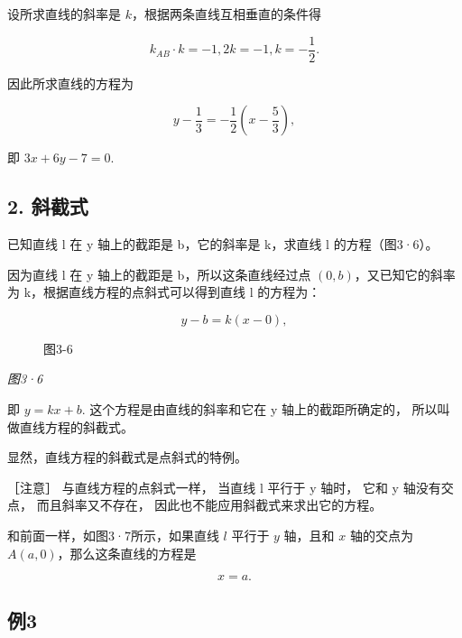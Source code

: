 设所求直线的斜率是 \(k\)，根据两条直线互相垂直的条件得

\[
k_{AB} \cdot k = - 1, 2 k = - 1, k = - \frac {1}{2}.
\]

因此所求直线的方程为

\[
y - \frac {1}{3} = - \frac {1}{2} (x - \frac {5}{3}),
\]

即 \(3x + 6y - 7 = 0.\)

\subsection{2. 斜截式}\label{ux659cux622aux5f0f}

已知直线 l 在 y 轴上的截距是 b，它的斜率是 k，求直线 l 的方程（图3·6）。

因为直线 l 在 y 轴上的截距是 b，所以这条直线经过点
\((0, b)\)，又已知它的斜率为 k，根据直线方程的点斜式可以得到直线 l
的方程为：

\[
y - b = k (x - 0),
\]

\begin{figure}
\centering
{}
\caption{图3-6}
\end{figure}

\emph{图3·6}

即 \(\boxed{y=kx+b.}\) 这个方程是由直线的斜率和它在 y
轴上的截距所确定的， 所以叫做直线方程的斜截式。

显然，直线方程的斜截式是点斜式的特例。

［注意］ 与直线方程的点斜式一样， 当直线 l 平行于 y 轴时， 它和 y
轴没有交点， 而且斜率又不存在， 因此也不能应用斜截式来求出它的方程。

和前面一样，如图3·7所示，如果直线 \(l\) 平行于 \(y\) 轴，且和 \(x\)
轴的交点为 \(A(a,0)\)，那么这条直线的方程是

\[
x = a.
\]

\subsection{例3}\label{ux4f8b3-8}

